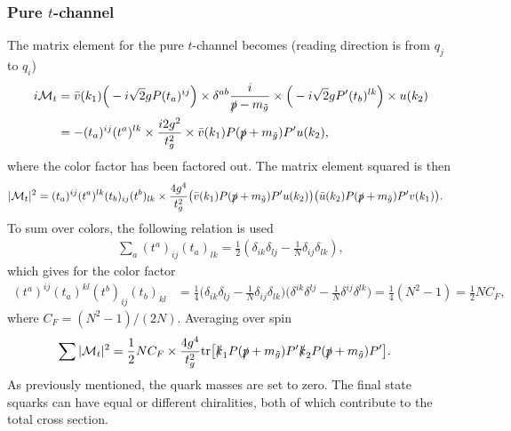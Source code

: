 \documentclass[twoside,english]{uiofysmaster}
\begin{document}
\subsubsection{Pure $t$-channel}

The matrix element for the pure $t$-channel becomes (reading direction is from $q_j$ to $q_i$)
\begin{align*}
i \mathcal{M}_t &= \bar{v} (k_1) \Big( -i \sqrt{2} g P (t_a)^{ij}\Big) \times \delta^{ab} \frac{i}{\slashed{p} - m_{\tilde{g}}} \times \Big( -i \sqrt{2} gP'(t_b)^{lk} \Big) \times u(k_2)\\
&= - (t_a)^{ij}(t^a)^{lk} \times \frac{i 2 g^2}{t_g^2} \times  \bar{v} (k_1)  P (\slashed{p} + m_{\tilde{g}}) P' u(k_2) ,
\end{align*}
where the color factor has been factored out. The matrix element squared is then
\begin{align*}
|\mathcal{M}_t|^2 &=  (t_a)^{ij} (t^a)^{lk} (t_b)_{ij} (t^b)_{lk} \times \frac{4 g^4}{t_g^2}
\big( \bar{v} (k_1)  P (\slashed{p} + m_{\tilde{g}}) P' u(k_2) \big)
\big( \bar{u} (k_2)  P (\slashed{p} + m_{\tilde{g}}) P' v(k_1) \big).
\end{align*}
To sum over colors, the following relation is used \cite{ellis2003qcd}
\begin{align}
\sum_a (t^a)_{ij} (t_a)_{lk} = \frac{1}{2} (\delta_{ik} \delta_{lj} - \frac{1}{N} \delta_{ij} \delta_{lk}),
\end{align}
which gives for the color factor
\begin{align*}
(t^a)^{ij}(t_a)^{kl}(t^b)_{ij}(t_b)_{kl} &= \frac{1}{4} 
\big(\delta_{ik} \delta_{lj} - \frac{1}{N} \delta_{ij} \delta_{lk} \big)
\big(\delta^{ik} \delta^{lj} - \frac{1}{N} \delta^{ij} \delta^{lk} \big) = \frac{1}{4} (N^2 - 1) = \frac{1}{2}NC_F,
\end{align*}
where $C_F = (N^2 - 1)/(2N)$. Averaging over spin
\begin{align*}
\sum |\mathcal{M}_t|^2 &= \frac{1}{2} NC_F \times \frac{4 g^4}{t_g^2} \text{tr} \big[ 
\slashed{k}_1 P (\slashed{p} + m_{\tilde{g}}) P' \slashed{k}_2 P (\slashed{p} + m_{\tilde{g}}) P' \big].
\end{align*}
As previously mentioned, the quark masses are set to zero. The final state squarks can have equal or different chiralities, both of which contribute to the total cross section.
\end{document}
